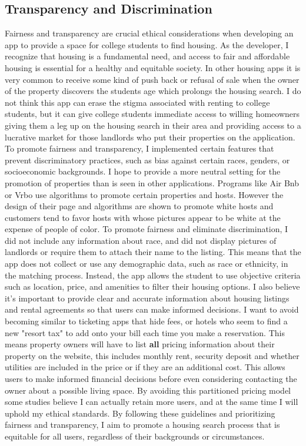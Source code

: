 \documentclass[10pt,twocolumn]{article}
\begin{document}
\subsection{Transparency and Discrimination}
Fairness and transparency are crucial ethical considerations when developing an app to provide a space for college students to find housing. As the developer, I recognize that housing is a fundamental need, and access to fair and affordable housing is essential for a healthy and equitable society. In other housing apps it is very common to receive some kind of push back or refusal of sale when the owner of the property discovers the students age which prolongs the housing search. I do not think this app can erase the stigma associated with renting to college students, but it can give college students immediate access to willing homeowners giving them a leg up on the housing search in their area and providing access to a lucrative market for those landlords who put their properties on the application. To promote fairness and transparency, I implemented certain features that prevent discriminatory practices, such as bias against certain races, genders, or socioeconomic backgrounds. I hope to provide a more neutral setting for the promotion of properties than is seen in other applications. Programs like Air Bnb or Vrbo use algorithms to promote certain properties and hosts. However the design of their page and algorithms are shown to promote white hosts and customers tend to favor hosts with whose pictures appear to be white at the expense of people of color.\cite{jaeger2020racial} To promote fairness and eliminate discrimination, I did not include any information about race, and did not display pictures of landlords or require them to attach their name to the listing. This means that the app does not collect or use any demographic data, such as race or ethnicity, in the matching process. Instead, the app allows the student to use objective criteria such as location, price, and amenities to filter their housing options. I also believe it's important to provide clear and accurate information about housing listings and rental agreements so that users can make informed decisions. I want to avoid becoming similar to ticketing apps that hide fees, or hotels who seem to find a new "resort tax" to add onto your bill each time you make a reservation. This means property owners will have to list \textbf{all} pricing information about their property on the website, this includes monthly rent, security deposit and whether utilities are included in the price or if they are an additional cost. This allows users to make informed financial decisions before even considering contacting the owner about a possible living space. By avoiding this partitioned pricing model some studies believe I can actually retain more users, and at the same time I will uphold my ethical standards. \cite{greenleaf2016price} By following these guidelines and prioritizing fairness and transparency, I aim to promote a housing search process that is equitable for all users, regardless of their backgrounds or circumstances. 
\end{document}
